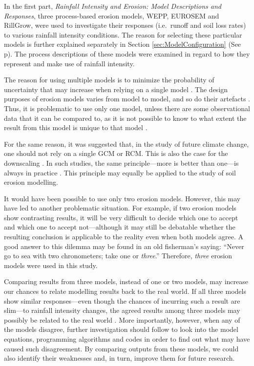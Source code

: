 In the first part, \textsl{Rainfall Intensity and Erosion: Model Descriptions
and Responses}, three process-based erosion models, WEPP, EUROSEM and RillGrow,
were used to investigate their responses (i.e.\ runoff and soil loss rates) to
various rainfall intensity conditions. The reason for selecting these particular
models is further explained separately in Section \ref{sec:ModelConfiguration}
(See p\pageref{sec:ModelConfiguration}). The process descriptions of these
models were examined in regard to how they represent and make use of rainfall
intensity.

The reason for using multiple models is to minimize the probability of
uncertainty that may increase when relying on a single model
\citep{ipcc2001-881}. The design purposes of erosion models varies from model to
model, and so do their artefacts \citep{favis-mortlock1998-141,jetten1999-521}.
Thus, it is problematic to use only one model, unless there are some
observational data that it can be compared to, as it is not possible to know to
what extent the result from this model is unique to that model
\citep{favis-mortlock1998-141,jetten1999-521}.

For the same reason, it was suggested that, in the study of future climate
change, one should not rely on a single GCM or RCM. This is also the case for
the downscaling \citep{mearns2003,wilby2004}. In such studies, the same
principle---more is better than one---is always in practice \citep{wilby2004}.
This principle may equally be applied to the study of soil erosion modelling.

It would have been possible to use only two erosion models. However, this may
have led to another problematic situation. For example, if two erosion models
show contrasting results, it will be very difficult to decide which one to
accept and which one to accept not---although it may still be debatable
whether the resulting conclusion is applicable to the reality even when both
models agree. A good answer to this dilemma may be found in an old fisherman's
saying: ``Never go to sea with two chronometers; take one or \emph{three}.''
Therefore, \emph{three} erosion models were used in this study.

Comparing results from three models, instead of one or two models, may increase
our chances to relate modelling results back to the real world.
If all three models show similar responses---even though the chances of
incurring such a result are slim---to rainfall intensity changes, the agreed
results among three models may possibly be related to the real world
\citep{araujo2007-42}.
More importantly, however, when any of the models disagree, further
investigation should follow to look into the model equations, programming
algorithms and codes in order to find out what may have caused such
disagreement. By comparing outputs from these models, we could also identify
their weaknesses and, in turn, improve them for future research.

